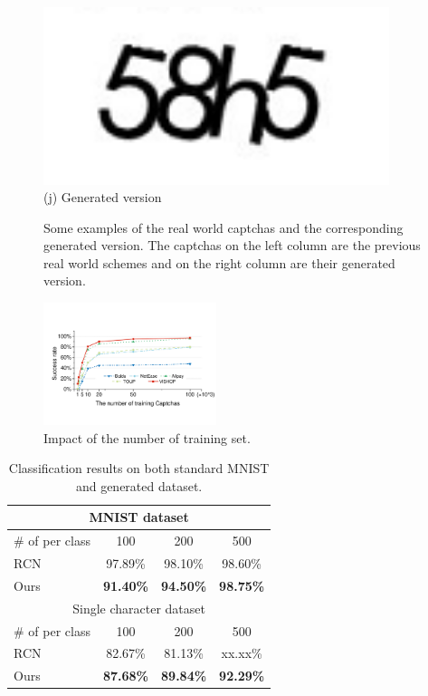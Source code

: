 \begin{figure}
{\begin{minipage}[t]{0.2\textwidth}
        \includegraphics[width=0.9\textwidth]{fig/generate_captchas/baidu_generator.png}\\
        \center (j) Generated version
    \end{minipage}
    }
  \caption{Some examples of the real world captchas and the corresponding generated version. The captchas on the left column are the previous real world schemes and on the right column are their generated version.}
  \label{fig: generate_show}
\end{figure}

\begin{figure}
  \centering
  \includegraphics[width=0.45\textwidth]{fig/training_set.pdf}
  \caption{Impact of the number of training set.}
  \label{fig: training_set}
\end{figure}

\begin{table}[t]
    \centering
    \caption{Classification results on both standard MNIST and generated dataset.}
    \label{table: mnist}
    \begin{tabular}{lccc}
        \toprule
        \multicolumn{4}{c}{MNIST dataset} \\
        \midrule
        \# of per class & 100  & 200 & 500\\
        \midrule
        RCN & 97.89\% & 98.10\% & 98.60\% \\
        Ours & \textbf{91.40\%} & \textbf{94.50\%} & \textbf{98.75\%} \\
        \toprule
        \multicolumn{4}{c}{Single character dataset} \\
        \midrule
        \# of per class & 100  & 200 & 500\\
        \midrule
        RCN & 82.67\% & 81.13\% & xx.xx\% \\
        Ours & \textbf{87.68\%} & \textbf{89.84\%} & \textbf{92.29\%} \\
        \bottomrule
    \end{tabular}
\end{table}

